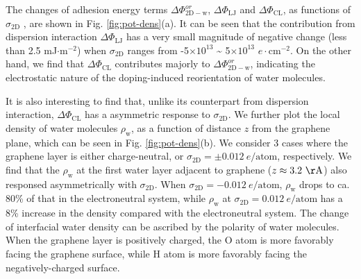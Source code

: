 \documentclass[journal=ancac3,manuscript=article,email=true]{achemso}
\begin{document}
The changes of adhesion energy terms \(\Delta
\Phi_{\mathrm{2D-w}}^{or}\), \(\Delta \Phi_{\mathrm{LJ}}\) and \(\Delta
\Phi_{\mathrm{CL}}\), as functions of \(\sigma_{\mathrm{2D}}\) , are
shown in Fig. \ref{fig:pot-dens}(a). It can be seen that the
contribution from dispersion interaction \(\Delta \Phi_{\mathrm{LJ}}\)
has a very small magnitude of negative change (less than 2.5 mJ\(\cdot
\mathrm{m}^{-2}\)) when \(\sigma_{\mathrm{2D}}\) ranges from
-5\(\times10^{13}\) \textasciitilde{} 5\(\times10^{13}\) \(e\cdot \mathrm{cm}^{-2}\). On the
other hand, we find that \(\Delta \Phi_{\mathrm{CL}}\) contributes
majorly to \(\Delta \Phi_{\mathrm{2D-w}}^{or}\), indicating the
electrostatic nature of the doping-induced reorientation of water
molecules.
\begin{center}
\end{center}
It is also interesting to find that, unlike its counterpart from
dispersion interaction, \(\Delta \Phi_{\mathrm{CL}}\) has a asymmetric
response to \(\sigma_{\mathrm{2D}}\). We further plot the local density
of water molecules \(\rho_{\mathrm{w}}\), as a function of distance \(z\)
from the graphene plane, which can be seen in Fig. \ref{fig:pot-dens}(b). We consider
3 cases where the graphene layer is either charge-neutral, or
\(\sigma_{\mathrm{2D}}=\pm 0.012\ e/ \mathrm{atom}\), respectively. We
find that the \(\rho_{\mathrm{w}}\) at the first water layer adjacent to
graphene (\(z \approx 3.2\ \mathrm{\AA}\)) also responsed asymmetrically with
\(\sigma_{\mathrm{2D}}\).  When \(\sigma_{\mathrm{2D}}=-0.012\ e/
\mathrm{atom}\), \(\rho_{\mathrm{w}}\) drops to ca. 80\% of that in the
electroneutral system, while \(\rho_{\mathrm{w}}\) at
\(\sigma_{\mathrm{2D}}=0.012\ e/ \mathrm{atom}\) has a 8\% increase in the density compared with the electroneutral system. The change of interfacial water
density can be ascribed by the polarity of water molecules. When the
graphene layer is positively charged, the O atom is more favorably
facing the graphene surface, while H atom is more favorably facing the
negatively-charged surface.
\begin{center}
\end{center}
\begin{center}
\end{center}
\end{document}
